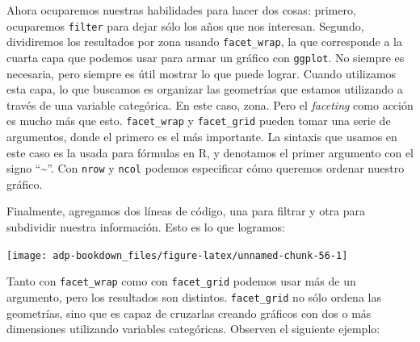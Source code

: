 \documentclass[]{book}
\newenvironment{Shaded}{\begin{snugshade}}{\end{snugshade}}
\newcommand{\DataTypeTok}[1]{\textcolor[rgb]{0.13,0.29,0.53}{#1}}
\newcommand{\DecValTok}[1]{\textcolor[rgb]{0.00,0.00,0.81}{#1}}
\newcommand{\KeywordTok}[1]{\textcolor[rgb]{0.13,0.29,0.53}{\textbf{#1}}}
\newcommand{\NormalTok}[1]{#1}
\newcommand{\OperatorTok}[1]{\textcolor[rgb]{0.81,0.36,0.00}{\textbf{#1}}}
\newcommand{\StringTok}[1]{\textcolor[rgb]{0.31,0.60,0.02}{#1}}
\begin{document}
Ahora ocuparemos nuestras habilidades para hacer dos cosas: primero,
ocuparemos \texttt{filter} para dejar sólo los años que nos interesan.
Segundo, dividiremos los resultados por zona usando
\texttt{facet\_wrap}, la que corresponde a la cuarta capa que podemos
usar para armar un gráfico con \texttt{ggplot}. No siempre es necesaria,
pero siempre es útil mostrar lo que puede lograr. Cuando utilizamos esta
capa, lo que buscamos es organizar las geometrías que estamos utilizando
a través de una variable categórica. En este caso, zona. Pero el
\emph{faceting} como acción es mucho más que esto. \texttt{facet\_wrap}
y \texttt{facet\_grid} pueden tomar una serie de argumentos, donde el
primero es el más importante. La sintaxis que usamos en este caso es la
usada para fórmulas en R, y denotamos el primer argumento con el signo
``\textasciitilde{}''. Con \texttt{nrow} y \texttt{ncol} podemos
especificar cómo queremos ordenar nuestro gráfico.

Finalmente, agregamos dos líneas de código, una para filtrar y otra para
subdividir nuestra información. Esto es lo que logramos:

\begin{Shaded}
\end{Shaded}

\begin{center}\texttt{[image: adp-bookdown\_files/figure-latex/unnamed-chunk-56-1]} \end{center}

Tanto con \texttt{facet\_wrap} como con \texttt{facet\_grid} podemos
usar más de un argumento, pero los resultados son distintos.
\texttt{facet\_grid} no sólo ordena las geometrías, sino que es capaz de
cruzarlas creando gráficos con dos o más dimensiones utilizando
variables categóricas. Observen el siguiente ejemplo:
\end{document}
